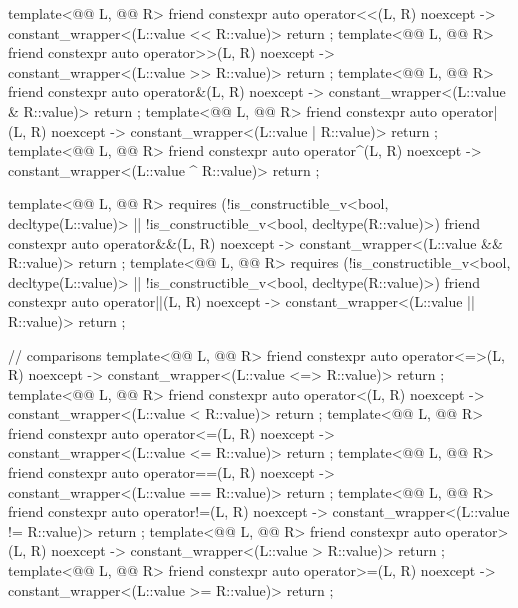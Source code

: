 \begin{codeblock}
{{    template<@@ L, @@ R>
      friend constexpr auto operator<<(L, R) noexcept -> constant_wrapper<(L::value << R::value)>
        { return {}; }
    template<@@ L, @@ R>
      friend constexpr auto operator>>(L, R) noexcept -> constant_wrapper<(L::value >> R::value)>
        { return {}; }
    template<@@ L, @@ R>
      friend constexpr auto operator&(L, R) noexcept -> constant_wrapper<(L::value & R::value)>
        { return {}; }
    template<@@ L, @@ R>
      friend constexpr auto operator|(L, R) noexcept -> constant_wrapper<(L::value | R::value)>
        { return {}; }
    template<@@ L, @@ R>
      friend constexpr auto operator^(L, R) noexcept -> constant_wrapper<(L::value ^ R::value)>
        { return {}; }

    template<@@ L, @@ R>
      requires (!is_constructible_v<bool, decltype(L::value)> ||
                !is_constructible_v<bool, decltype(R::value)>)
        friend constexpr auto operator&&(L, R) noexcept
          -> constant_wrapper<(L::value && R::value)>
            { return {}; }
    template<@@ L, @@ R>
      requires (!is_constructible_v<bool, decltype(L::value)> ||
                !is_constructible_v<bool, decltype(R::value)>)
        friend constexpr auto operator||(L, R) noexcept
          -> constant_wrapper<(L::value || R::value)>
            { return {}; }

    // comparisons
    template<@@ L, @@ R>
      friend constexpr auto operator<=>(L, R) noexcept
        -> constant_wrapper<(L::value <=> R::value)>
          { return {}; }
    template<@@ L, @@ R>
      friend constexpr auto operator<(L, R) noexcept -> constant_wrapper<(L::value < R::value)>
        { return {}; }
    template<@@ L, @@ R>
      friend constexpr auto operator<=(L, R) noexcept -> constant_wrapper<(L::value <= R::value)>
        { return {}; }
    template<@@ L, @@ R>
      friend constexpr auto operator==(L, R) noexcept -> constant_wrapper<(L::value == R::value)>
        { return {}; }
    template<@@ L, @@ R>
      friend constexpr auto operator!=(L, R) noexcept -> constant_wrapper<(L::value != R::value)>
        { return {}; }
    template<@@ L, @@ R>
      friend constexpr auto operator>(L, R) noexcept -> constant_wrapper<(L::value > R::value)>
        { return {}; }
    template<@@ L, @@ R>
      friend constexpr auto operator>=(L, R) noexcept -> constant_wrapper<(L::value >= R::value)>
        { return {}; }

}}
\end{codeblock}
